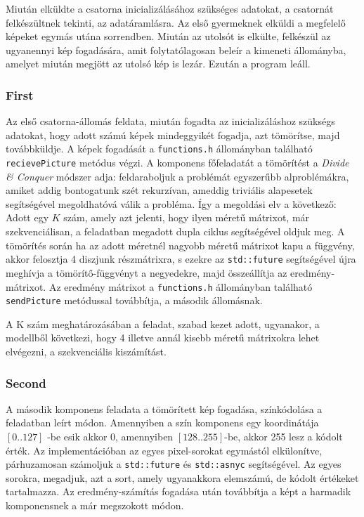 \documentclass[12pt]{article}
\begin{document}
Miután elküldte a csatorna inicializálásához szükséges adatokat, a csatornát felkészültnek tekinti, az adatáramlásra. Az első gyermeknek elküldi a megfelelő képeket egymás utána sorrendben. Miután az utolsót is elkülte, felkészül az ugyanennyi kép fogadására, amit folytatólagosan beleír a kimeneti állományba, amelyet miután megjött az utolsó kép is lezár. Ezután a program leáll.


\subsubsection{First}
Az első csatorna-állomás feldata, miután fogadta az inicializáláshoz szükségs adatokat, hogy adott számú képek mindeggyikét fogadja, azt tömörítse, majd továbbküldje.
A képek fogadását a \verb|functions.h| állományban található \verb|recievePicture| metódus végzi. A komponens főfeladatát a tömörítést a \textit{Divide \& Conquer} módszer adja: feldaraboljuk a problémát egyszerűbb alproblémákra, amiket addig bontogatunk szét rekurzívan, ameddig triviális alapesetek segítségével megoldhatóvá válik a probléma.
Így a megoldási elv a következő:
Adott egy $K$ szám, amely azt jelenti, hogy ilyen méretű mátrixot, már szekvenciálisan, a feladatban megadott dupla ciklus segítségével oldjuk meg. A tömörítés során ha az adott méretnél nagyobb méretű mátrixot kapu a függvény, akkor felosztja 4 diszjunk részmátrixra, s ezekre az \verb|std::future| segítségével újra meghívja a tömörítő-függvényt a negyedekre, majd összeállítja az eredmény-mátrixot.
Az eredmény mátrixot a \verb|functions.h| állományban található \verb|sendPicture| metódussal továbbítja, a második állomásnak.

A K szám meghatározásában a feladat, szabad kezet adott, ugyanakor, a modellből következi, hogy 4 illetve annál kisebb méretű mátrixokra lehet elvégezni, a szekvenciális kiszámítást.

\subsubsection{Second}
A második komponens feladata a tömörített kép fogadása, színkódolása a feladatban leírt módon. Amennyiben a szín komponens egy koordinátája $[0..127]$ -be esik akkor 0, amennyiben $[128..255]$-be, akkor 255 lesz a kódolt érték.
Az implementációban az egyes pixel-sorokat egymástól elkülonítve, párhuzamosan számoljuk a \verb|std::future| és \verb|std::asnyc| segítségével. Az egyes sorokra, megadjuk, azt a sort, amely ugyanakkora elemszámú, de kódolt értékeket tartalmazza.
Az eredmény-számítás fogadása után továbbítja a képt a harmadik komponensnek a már megszokott módon.
\end{document}
